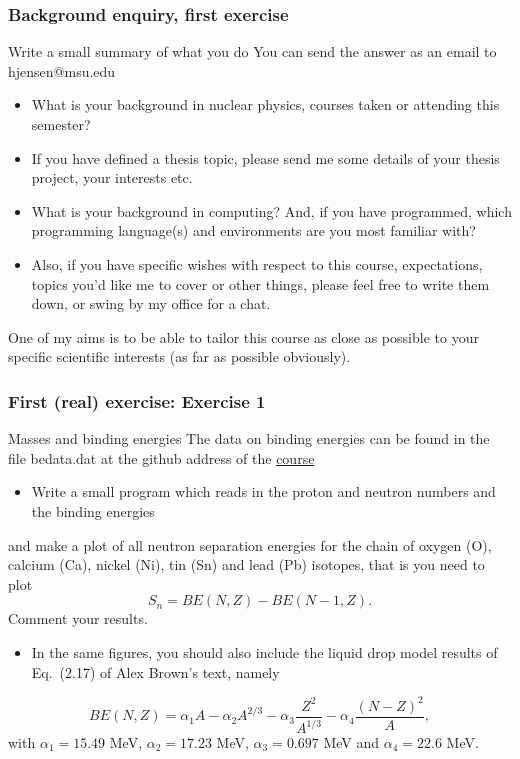 \documentclass{beamer}
\begin{document}
\begin{frame}
\frametitle{Background enquiry, first exercise}

\begin{block}{Write a small summary of what you do }
You can send the answer as an email to hjensen@msu.edu
\begin{itemize}
\item What is your background in nuclear physics, courses taken or attending this semester? 

\item If you have defined a thesis topic, please send me some details of your thesis project, your interests etc.

\item What is your background in computing? And, if you have programmed, which programming language(s) and environments  are you  most familiar with?  

\item Also, if you have specific wishes with respect to this course, expectations, topics you'd like me to cover or other things, please feel free to write them down, or swing by my office for a chat. 
\end{itemize}

\noindent
One of my aims is to be able to tailor this course as close as possible to your specific scientific interests (as far as possible obviously).
\end{block}
\end{frame}

\begin{frame}
\frametitle{First (real) exercise: Exercise 1}

\begin{block}{Masses and binding energies }
The data on binding energies can be found in the file bedata.dat at the github address of the \href{{https://github.com/NuclearStructure/PHY981/tree/master/doc/pub/spdata/programs}}{course}

\begin{itemize}
  \item Write a small program which reads in the proton and neutron numbers and the binding energies 
\end{itemize}

\noindent
and make a plot of all neutron separation energies for the chain of oxygen (O), calcium (Ca), nickel (Ni), tin (Sn) and lead (Pb) isotopes, that is you need to plot
\[
S_n= BE(N,Z)-BE(N-1,Z).
\]
Comment your results. 
\begin{itemize}
 \item In the same figures, you should also include the liquid drop model results of Eq.~(2.17) of Alex Brown's text, namely
\end{itemize}

\noindent
\[
BE(N,Z)= \alpha_1A-\alpha_2A^{2/3}-\alpha_3\frac{Z^2}{A^{1/3}}-\alpha_4\frac{(N-Z)^2}{A},
\]
with $\alpha_1=15.49$ MeV, $\alpha_2=17.23$ MeV, $\alpha_3=0.697$ MeV and $\alpha_4=22.6$ MeV.

\end{block}
\end{frame}
\end{document}
